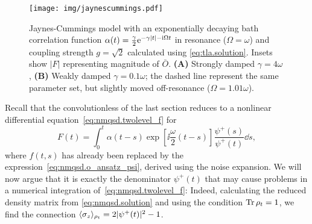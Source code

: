 \begin{figure}
  \centering
  \texttt{[image: img/jaynescummings.pdf]}
  \caption{%
    Jaynes-Cummings model with an exponentially decaying bath correlation function $\alpha(t) = \frac{\gamma}{2} \exp[-\gamma\abs{t} - \ii\Omega t]$ in resonance ($\Omega = \omega$) and coupling strength $g = \sqrt{2}$ calculated using \autoref{eq:tla.solution}.
    Insets show $\vert F \vert$ representing magnitude of $\bar O$.
    \textbf{(A)} Strongly damped $\gamma = 4\omega$,
    \textbf{(B)} Weakly damped $\gamma = 0.1\omega$; the dashed line represent the same parameter set, but slightly moved off-resonance ($\Omega = 1.01\omega$).
  }
  \label{fig:nmqsd.jaynes_cummings}
\end{figure}


Recall that the convolutionless \NMSSE of the last section reduces to a nonlinear differential equation~\ref{eq:nmqsd.twolevel_f} for
\begin{equation}
  F(t) = \int_0^t \alpha(t - s) \exp[\ii \frac{\omega}{2} (t - s)] \frac{\psi^+(s)}{\psi^+(t)} \dd s,
  \label{eq:nmqsd.twolevel_f_integral}
\end{equation}
where $f(t, s)$ has already been replaced by the expression~\ref{eq:nmqsd.o_ansatz_psi}, derived using the noise expansion.
We will now argue that it is exactly the denominator $\psi^+(t)$ that may cause problems in a numerical integration of~\ref{eq:nmqsd.twolevel_f}:
Indeed, calculating the reduced density matrix from \autoref{eq:nmqsd.solution} and using the condition $\operatorname{Tr} \rho_t = 1$, we find the connection $\langle \sigma_z \rangle_{\rho_t} = 2\vert \psi^+(t) \vert^2 - 1$.

%

